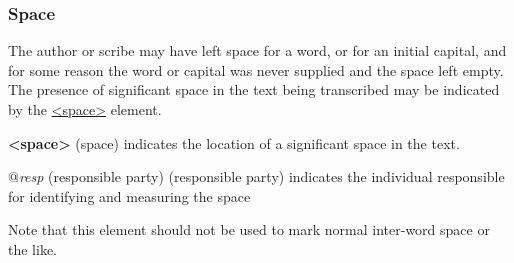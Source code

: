 \subsubsection[{Space}]{Space}\label{PHSP}\par
The author or scribe may have left space for a word, or for an initial capital, and for some reason the word or capital was never supplied and the space left empty. The presence of significant space in the text being transcribed may be indicated by the \hyperref[TEI.space]{<space>} element. 
\begin{sansreflist}
  
\item [\textbf{<space>}] (space) indicates the location of a significant space in the text.\hfil\\[-10pt]\begin{sansreflist}
    \item[@{\itshape resp}]
  (responsible party) (responsible party) indicates the individual responsible for identifying and measuring the space
\end{sansreflist}  
\end{sansreflist}
 Note that this element should not be used to mark normal inter-word space or the like.\par
